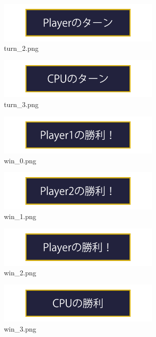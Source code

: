 \documentclass[a4j,titlepage]{jsarticle}
\begin{document}
\begin{figure}[H]
  \centering
  \includegraphics[width=8cm]{../images/turn_2.png}
  \caption{turn\_2.png}
  \label{fig:turn_2}
\end{figure}

\begin{figure}[H]
  \centering
  \includegraphics[width=8cm]{../images/turn_3.png}
  \caption{turn\_3.png}
  \label{fig:turn_3}
\end{figure}

\begin{figure}[H]
  \centering
  \includegraphics[width=8cm]{../images/win_0.png}
  \caption{win\_0.png}
  \label{fig:win_0}
\end{figure}

\begin{figure}[H]
  \centering
  \includegraphics[width=8cm]{../images/win_1.png}
  \caption{win\_1.png}
  \label{fig:win_1}
\end{figure}

\begin{figure}[H]
  \centering
  \includegraphics[width=8cm]{../images/win_2.png}
  \caption{win\_2.png}
  \label{fig:win_2}
\end{figure}

\begin{figure}[H]
  \centering
  \includegraphics[width=8cm]{../images/win_3.png}
  \caption{win\_3.png}
  \label{fig:win_3}
\end{figure}
\end{document}
